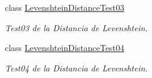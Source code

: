 \begin{DoxyCompactItemize}
class \hyperlink{classclases_1_1_distancia_levenshtein_1_1_levenshtein_distance_test03}{Levenshtein\+Distance\+Test03}
\begin{DoxyCompactList}\small\item\em Test03 de la Distancia de Levenshtein. \end{DoxyCompactList}\item 
class \hyperlink{classclases_1_1_distancia_levenshtein_1_1_levenshtein_distance_test04}{Levenshtein\+Distance\+Test04}
\begin{DoxyCompactList}\small\item\em Test04 de la Distancia de Levenshtein. \end{DoxyCompactList}\end{DoxyCompactItemize}
